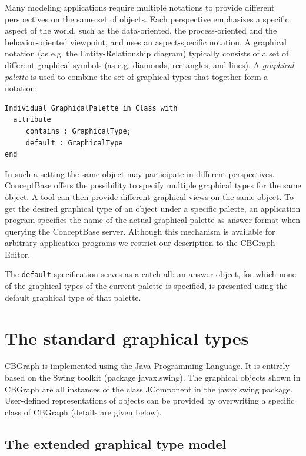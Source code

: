 Many modeling applications require multiple notations to provide different
perspectives on the same set of objects. Each perspective
emphasizes a specific aspect of the world, such as the data-oriented,
the process-oriented and the behavior-oriented viewpoint, and
uses an aspect-specific notation.
A graphical notation (as e.g. the Entity-Relationship diagram)
typically consists of a set of different graphical symbols
(as e.g. diamonds, rectangles, and lines).
A {\em graphical palette} is used to combine the set of
graphical types that together form a notation:

{\small
\begin{verbatim}
Individual GraphicalPalette in Class with
  attribute
     contains : GraphicalType;
     default : GraphicalType
end
\end{verbatim}
}

In such a setting the same object may participate in different perspectives.
ConceptBase offers the possibility to specify multiple graphical types for
the same object. A tool can then provide different graphical views on the
same object. To get the desired graphical type of an object under a specific
palette, an application program specifies the name of the actual graphical
palette as answer format when querying the ConceptBase server. Although this
mechanism is available for arbitrary application programs we restrict our
description to the CBGraph Editor.

The {\tt default} specification serves as a catch all: an answer object, for
which none of the graphical types of the current palette is specified, is
presented using the default graphical type of that palette.


\section{The standard graphical types}
\label{GTsforGB}

CBGraph is implemented using the Java Programming Language.
It is entirely based on the Swing toolkit (package javax.swing).
The graphical objects shown in CBGraph are all instances
of the class JComponent in the javax.swing package. User-defined
representations of objects can be provided by overwriting a specific
class of CBGraph (details are given below).

\subsection{The extended graphical type model}

